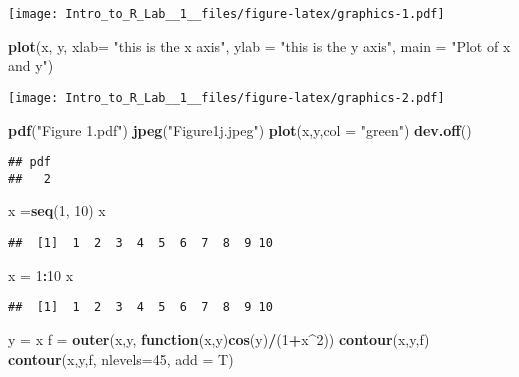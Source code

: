 \documentclass[]{article}
\newenvironment{Shaded}{\begin{snugshade}}{\end{snugshade}}
\newcommand{\KeywordTok}[1]{\textcolor[rgb]{0.13,0.29,0.53}{\textbf{#1}}}
\newcommand{\DataTypeTok}[1]{\textcolor[rgb]{0.13,0.29,0.53}{#1}}
\newcommand{\DecValTok}[1]{\textcolor[rgb]{0.00,0.00,0.81}{#1}}
\newcommand{\StringTok}[1]{\textcolor[rgb]{0.31,0.60,0.02}{#1}}
\newcommand{\ControlFlowTok}[1]{\textcolor[rgb]{0.13,0.29,0.53}{\textbf{#1}}}
\newcommand{\OperatorTok}[1]{\textcolor[rgb]{0.81,0.36,0.00}{\textbf{#1}}}
\newcommand{\NormalTok}[1]{#1}
\begin{document}
\texttt{[image: Intro\_to\_R\_Lab\_\_1\_\_files/figure-latex/graphics-1.pdf]}

\begin{Shaded}
\begin{Highlighting}[]
\KeywordTok{plot}\NormalTok{(x, y, }\DataTypeTok{xlab=} \StringTok{"this is the x axis"}\NormalTok{, }\DataTypeTok{ylab =} \StringTok{"this is the y axis"}\NormalTok{, }\DataTypeTok{main =} \StringTok{"Plot of x and y"}\NormalTok{)}
\end{Highlighting}
\end{Shaded}

\texttt{[image: Intro\_to\_R\_Lab\_\_1\_\_files/figure-latex/graphics-2.pdf]}

\begin{Shaded}
\begin{Highlighting}[]
\KeywordTok{pdf}\NormalTok{(}\StringTok{"Figure 1.pdf"}\NormalTok{)}
\KeywordTok{jpeg}\NormalTok{(}\StringTok{"Figure1j.jpeg"}\NormalTok{)}
\KeywordTok{plot}\NormalTok{(x,y,}\DataTypeTok{col =} \StringTok{"green"}\NormalTok{)}
\KeywordTok{dev.off}\NormalTok{()}
\end{Highlighting}
\end{Shaded}

\begin{verbatim}
## pdf 
##   2
\end{verbatim}

\begin{Shaded}
\begin{Highlighting}[]
\NormalTok{x =}\KeywordTok{seq}\NormalTok{(}\DecValTok{1}\NormalTok{, }\DecValTok{10}\NormalTok{)}
\NormalTok{x}
\end{Highlighting}
\end{Shaded}

\begin{verbatim}
##  [1]  1  2  3  4  5  6  7  8  9 10
\end{verbatim}

\begin{Shaded}
\begin{Highlighting}[]
\NormalTok{x =}\StringTok{ }\DecValTok{1}\OperatorTok{:}\DecValTok{10}
\NormalTok{x}
\end{Highlighting}
\end{Shaded}

\begin{verbatim}
##  [1]  1  2  3  4  5  6  7  8  9 10
\end{verbatim}

\begin{Shaded}
\begin{Highlighting}[]
\NormalTok{y =}\StringTok{ }\NormalTok{x}
\NormalTok{f =}\StringTok{ }\KeywordTok{outer}\NormalTok{(x,y, }\ControlFlowTok{function}\NormalTok{(x,y)}\KeywordTok{cos}\NormalTok{(y)}\OperatorTok{/}\NormalTok{(}\DecValTok{1}\OperatorTok{+}\NormalTok{x}\OperatorTok{^}\DecValTok{2}\NormalTok{))}
\KeywordTok{contour}\NormalTok{(x,y,f)}
\KeywordTok{contour}\NormalTok{(x,y,f, }\DataTypeTok{nlevels=}\DecValTok{45}\NormalTok{, }\DataTypeTok{add =}\NormalTok{ T)}
\end{Highlighting}
\end{Shaded}
\end{document}

